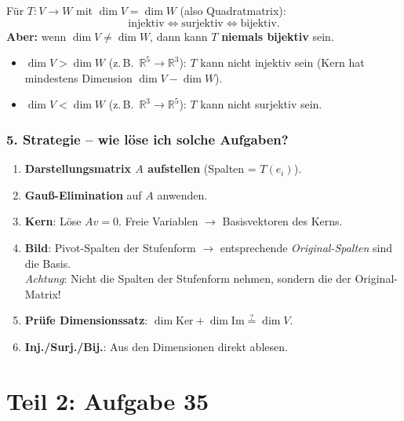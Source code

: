 \documentclass[a4paper,12pt]{article}
\begin{document}
\begin{merkbox}[title={Wichtige Konsequenz}]
F\"ur $T \colon V \to W$ mit $\dim V = \dim W$ (also Quadratmatrix):
\[
\text{injektiv} \iff \text{surjektiv} \iff \text{bijektiv}.
\]
\textbf{Aber:} wenn $\dim V \neq \dim W$, dann kann $T$ \textbf{niemals bijektiv} sein.
\begin{itemize}[nosep]
    \item $\dim V > \dim W$ (z.\,B.\ $\mathbb{R}^5 \to \mathbb{R}^3$): $T$ kann nicht injektiv sein (Kern hat mindestens Dimension $\dim V - \dim W$).
    \item $\dim V < \dim W$ (z.\,B.\ $\mathbb{R}^3 \to \mathbb{R}^5$): $T$ kann nicht surjektiv sein.
\end{itemize}
\end{merkbox}

\section*{5. Strategie -- wie l\"ose ich solche Aufgaben?}

\begin{merkbox}[title={Kochrezept}]
\begin{enumerate}[nosep]
    \item \textbf{Darstellungsmatrix $A$ aufstellen} (Spalten = $T(e_i)$).
    \item \textbf{Gau\ss-Elimination} auf $A$ anwenden.
    \item \textbf{Kern}: L\"ose $Av = 0$. Freie Variablen $\to$ Basisvektoren des Kerns.
    \item \textbf{Bild}: Pivot-Spalten der Stufenform $\to$ entsprechende \emph{Original-Spalten} sind die Basis. \\
    \emph{Achtung}: Nicht die Spalten der Stufenform nehmen, sondern die der Original-Matrix!
    \item \textbf{Pr\"ufe Dimensionssatz}: $\dim \text{Ker} + \dim \text{Im} \stackrel{?}{=} \dim V$.
    \item \textbf{Inj./Surj./Bij.}: Aus den Dimensionen direkt ablesen.
\end{enumerate}
\end{merkbox}

\newpage

\part*{Teil 2: Aufgabe 35}
\end{document}
